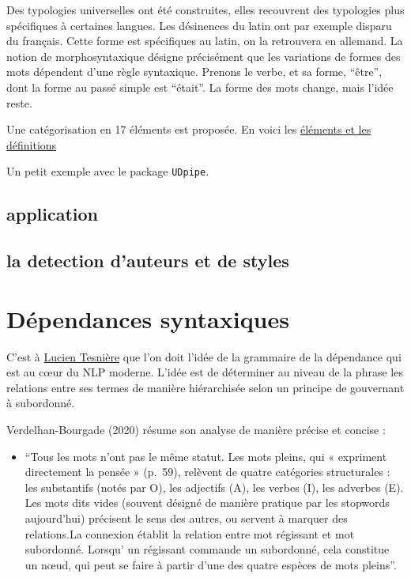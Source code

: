 \documentclass[
  letterpaper,
  DIV=11,
  numbers=noendperiod]{scrreprt}
\providecommand{\tightlist}{%
  \setlength{\itemsep}{0pt}\setlength{\parskip}{0pt}}\usepackage{longtable,booktabs,array}
\begin{document}
Des typologies universelles ont été construites, elles recouvrent des
typologies plus spécifiques à certaines langues. Les désinences du latin
ont par exemple disparu du français. Cette forme est spécifiques au
latin, on la retrouvera en allemand. La notion de morphosyntaxique
désigne précisément que les variations de formes des mots dépendent
d'une règle syntaxique. Prenons le verbe, et sa forme, ``être'', dont la
forme au passé simple est ``était''. La forme des mots change, mais
l'idée reste.

Une catégorisation en 17 éléments est proposée. En voici les
\href{https://universaldependencies.org/u/pos/}{éléments et les
définitions}

Un petit exemple avec le package \texttt{UDpipe}.

\subsection{application}\label{application-1}

\subsection{la detection d'auteurs et de
styles}\label{la-detection-dauteurs-et-de-styles}

\section{Dépendances syntaxiques}\label{duxe9pendances-syntaxiques}

C'est à
\href{https://www.ac-sciences-lettres-montpellier.fr/academie_edition/fichiers_conf/VERDELHAN-BOURGADE-2020.pdf}{Lucien
Tesnière} que l'on doit l'idée de la grammaire de la dépendance qui est
au cœur du NLP moderne. L'idée est de déterminer au niveau de la phrase
les relations entre ses termes de manière hiérarchisée selon un principe
de gouvernant à subordonné.

Verdelhan-Bourgade (2020) résume son analyse de manière précise et
concise :

\begin{itemize}
\tightlist
\item
  ``Tous les mots n'ont pas le même statut. Les mots pleins, qui «
  expriment directement la pensée » (p.~59), relèvent de quatre
  catégories structurales : les substantifs (notés par O), les adjectifs
  (A), les verbes (I), les adverbes (E). Les mots dits vides (souvent
  désigné de manière pratique par les stopwords aujourd'hui) précisent
  le sens des autres, ou servent à marquer des relations.La connexion
  établit la relation entre mot régissant et mot subordonné. Lorsqu' un
  régissant commande un subordonné, cela constitue un nœud, qui peut se
  faire à partir d'une des quatre espèces de mots pleins''.
\end{itemize}
\end{document}
